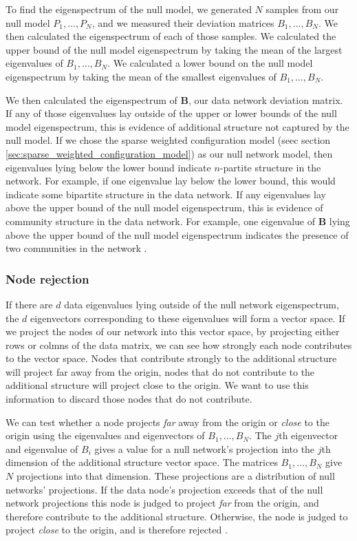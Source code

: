 \documentclass[a4paper,12pt]{article}
\theoremstyle{definition}
\begin{document}
        To find the eigenspectrum of the null model, we generated $N$ samples from our null model $P_1, \dots, P_N$, and we measured their deviation matrices $B_1, \dots, B_N$. We then calculated the eigenspectrum of each of those samples. We calculated the upper bound of the null model eigenspectrum by taking the mean of the largest eigenvalues of $B_1, \dots, B_N$. We calculated a lower bound on the null model eigenspectrum by taking the mean of the smallest eigenvalues of $B_1, \dots, B_N$. 

        We then calculated the eigenspectrum of $\mathbf{B}$, our data network deviation matrix. If any of those eigenvalues lay outside of the upper or lower bounds of the null model eigenspectrum, this is evidence of additional structure not captured by the null model. If we chose the sparse weighted configuration model (seec section \ref{sec:sparse_weighted_configuration_model}) as our null network model, then eigenvalues lying below the lower bound indicate $n$-partite structure in the network. For example, if one eigenvalue lay below the lower bound, this would indicate some bipartite structure in the data network. If any eigenvalues lay above the upper bound of the null model eigenspectrum, this is evidence of community structure in the data network. For example, one eigenvalue of $\mathbf{B}$ lying above the upper bound of the null model eigenspectrum indicates the presence of two communities in the network \cite{humphries2}.

        \subsubsection{Node rejection}
        If there are $d$ data eigenvalues lying outside of the null network eigenspectrum, the $d$ eigenvectors corresponding to these eigenvalues will form a vector space. If we project the nodes of our network into this vector space, by projecting either rows or colmns of the data matrix, we can see how strongly each node contributes to the vector space. Nodes that contribute strongly to the additional structure will project far away from the origin, nodes that do not contribute to the additional structure will project close to the origin. We want to use this information to discard those nodes that do not contribute.

        We can test whether a node projects \textit{far} away from the origin or \textit{close} to the origin using the eigenvalues and eigenvectors of $B_1, \dots, B_N$. The $j$th eigenvector and eigenvalue of $B_i$ gives a value for a null network's projection into the $j$th dimension of the additional structure vector space. The matrices $B_1, \dots, B_N$ give $N$ projections into that dimension. These projections are a distribution of null networks' projections. If the data node's projection exceeds that of the null network projections this node is judged to project \textit{far} from the origin, and therefore contribute to the additional structure. Otherwise, the node is judged to project \textit{close} to the origin, and is therefore rejected \cite{humphries}.
\end{document}
